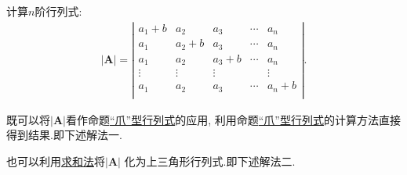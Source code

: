 \documentclass[../../main.tex]{subfiles}%
\begin{document}
\begin{example}
计算$n$阶行列式:
\begin{equation}
\begin{split}
|\boldsymbol{A}|=\left| \begin{matrix}
a_1+b&		a_2&		a_3&		\cdots&		a_n\\
a_1&		a_2+b&		a_3&		\cdots&		a_n\\
a_1&		a_2&		a_3+b&		\cdots&		a_n\\
\vdots&		\vdots&		\vdots&		&		\vdots\\
a_1&		a_2&		a_3&		\cdots&		a_n+b\\
\end{matrix} \right|.
\end{split}
\nonumber
\end{equation}
\begin{note}
既可以将$|\boldsymbol{A}|$看作命题\hyperref["爪"型行列式]{“爪”型行列式}的应用,
利用命题\hyperref["爪"型行列式]{“爪”型行列式}的计算方法直接得到结果.即下述解法一.

也可以利用\hyperlink{行列式计算:求和法}{求和法}将$|\boldsymbol{A}|$
化为上三角形行列式.即下述解法二.
\end{note}
\begin{solution}


\end{solution}
\end{example}
\end{document}

